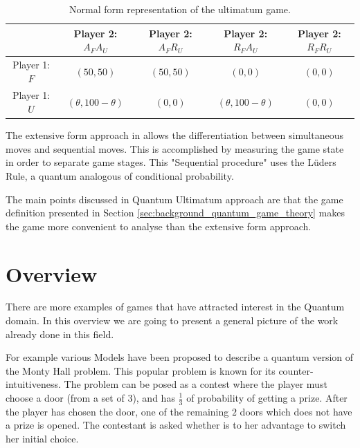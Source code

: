 \begin{center}
\begin{table}[h]
\begin{centering}
\begin{tabular}{ccccc}
\hline 
 & Player 2: $A_{F}A_{U}$ & Player 2: $A_{F}R_{U}$ & Player 2: $R_{F}A_{U}$ & Player 2: $R_{F}R_{U}$\tabularnewline
\hline 
Player 1: $F$ & $(50,50)$ & $(50,50)$& $(0,0)$ & $(0,0)$\tabularnewline
Player 1: $U$ & $(\theta,100-\theta)$ & $(0,0)$& $(\theta,100-\theta)$ & $(0,0)$\tabularnewline
\hline 
\end{tabular}
\par\end{centering}

\caption{Normal form representation of the ultimatum game.}
\label{tab:tabelaultimatumestoufofida}
\end{table}
\par\end{center}

The extensive form approach in \cite{Fra2011} allows the differentiation between simultaneous moves and sequential moves. This is accomplished by measuring the game state in order to separate game stages. This "Sequential procedure" uses the L\"{u}ders Rule, a quantum analogous of conditional probability.


The main points discussed in  \cite{Fra2011} Quantum Ultimatum approach are that the game definition presented in Section \ref{sec:background_quantum_game_theory}  makes the game more convenient to analyse than the extensive form approach.






\clearpage
\section{Overview}
\label{sec:related_work_overview}


There are more examples of games that have attracted interest in the Quantum domain. In this overview we are going to present a general picture of the work already done in this field.
 
For example various Models have been proposed to describe a quantum version of the Monty Hall problem\cite{Gill}\cite{Flitney2008}.
This popular problem\cite{Savant1990} is known for its counter-intuitiveness. The problem can be posed as a contest where the player must choose a door (from a set of $3$), and has $\frac{1}{3}$ of probability of getting a prize. After the player has chosen the door, one of the remaining $2$ doors which does not have a prize is opened. The contestant is asked whether is to her advantage to switch her initial choice.

